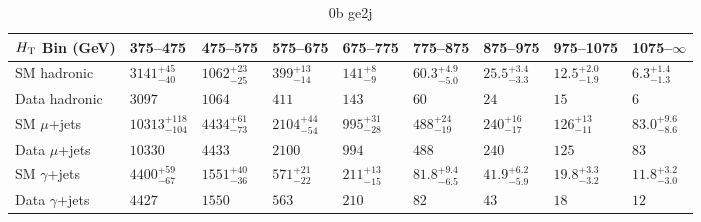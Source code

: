 \documentclass[8pt]{article}
\def\scalht{\mbox{$H_{\rm{T}}$}\xspace}
\newcommand\T{\rule{0pt}{2.6ex}}
\newcommand\B{\rule[-1.2ex]{0pt}{0pt}}
\begin{document}
\begin{table}[ht!]
\caption{0b ge2j}
\label{tab:ensemble-0b ge2j}
\centering
\begin{tabular}{ lllllllll }

\hline
\scalht Bin (GeV)       & 375--475                       & 475--575                       & 575--675                       & 675--775                       & 775--875                       & 875--975                       & 975--1075                      & 1075--$\infty$                 \\ [1.000000ex]
\hline
SM hadronic\T           & $3141^{+45}_{-40}$             & $1062^{+23}_{-25}$             & $399^{+13}_{-14}$              & $141^{+8}_{-9}$                & $60.3^{+4.9}_{-5.0}$           & $25.5^{+3.4}_{-3.3}$           & $12.5^{+2.0}_{-1.9}$           & $6.3^{+1.4}_{-1.3}$            \\ 
Data hadronic\B         & $3097$                         & $1064$                         & $411$                          & $143$                          & $60$                           & $24$                           & $15$                           & $6$                            \\ 
\hline
SM $\mu$+jets\T         & $10313^{+118}_{-104}$          & $4434^{+61}_{-73}$             & $2104^{+44}_{-54}$             & $995^{+31}_{-28}$              & $488^{+24}_{-19}$              & $240^{+16}_{-17}$              & $126^{+13}_{-11}$              & $83.0^{+9.6}_{-8.6}$           \\ 
Data $\mu$+jets\B       & $10330$                        & $4433$                         & $2100$                         & $994$                          & $488$                          & $240$                          & $125$                          & $83$                           \\ 
\hline
SM $\gamma$+jets\T      & $4400^{+59}_{-67}$             & $1551^{+40}_{-36}$             & $571^{+21}_{-22}$              & $211^{+13}_{-15}$              & $81.8^{+9.4}_{-6.5}$           & $41.9^{+6.2}_{-5.9}$           & $19.8^{+3.3}_{-3.2}$           & $11.8^{+3.2}_{-3.0}$           \\ 
Data $\gamma$+jets\B    & $4427$                         & $1550$                         & $563$                          & $210$                          & $82$                           & $43$                           & $18$                           & $12$                           \\ 
\hline

\end{tabular}
\end{table}
\end{document}
